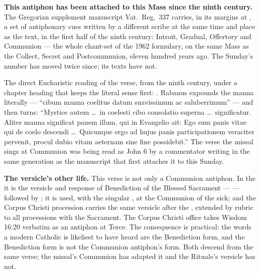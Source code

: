 \textbf{This antiphon has been attached to this Mass since the ninth century.}
The Gregorian supplement manuscript Vat.\ Reg.\ 337 carries, in its margins at
, a set of antiphonary cues written by a
different scribe at the same time and place as the text, in the first half of
the ninth century:  Introit, Gradual,
Offertory and Communion --- the whole chant-set of the 1962 formulary, on the
same Mass as the Collect, Secret and Postcommunion, eleven hundred years ago.
The Sunday's number has moved twice since; its texts have not.

\begin{witnessnote}
The direct Eucharistic reading of the verse, from the ninth century, under a
chapter heading that keeps the literal sense first: . Rabanus expounds the
manna literally --- ``cibum manna coelitus datum suavissimum ac saluberrimum''
--- and then turns: ``Mystice autem \dots\ in coelesti cibo consolatio superna
\dots\ significatur. Aliter manna significat panem illum, qui in Evangelio ait:
Ego sum panis vitae qui de coelo descendi \dots\ Quicunque ergo ad hujus panis
participationem veraciter pervenit, procul dubio vitam aeternam sine fine
possidebit.'' The verse the missal sings at Communion was being read as John 6
by a commentator writing in the same generation as the manuscript that first
attaches it to this Sunday.
\end{witnessnote}

\textbf{The versicle's other life.} This verse is not only a Communion
antiphon. In the  it is the versicle and response of
Benediction of the Blessed Sacrament ---  --- followed by ; it is used, with the singular
, at the Communion of the sick; and the Corpus Christi
procession carries the same versicle after the , extended by
rubric to all processions with the Sacrament. The Corpus Christi office takes
Wisdom 16:20 verbatim as an antiphon at Terce. The consequence is
practical: the words a modern Catholic is likeliest to have heard are the
Benediction form, and the Benediction form is not the Communion antiphon's
form. Both descend from the same verse; the missal's Communion has adapted it
and the Rituale's versicle has not.

